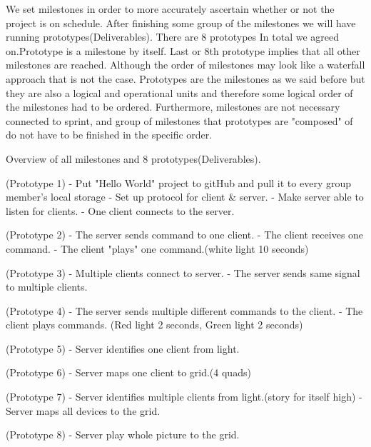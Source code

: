 \documentclass{article}
\begin{document}
We set milestones in order to more accurately ascertain whether or not the project is on schedule. After finishing some group of the milestones we will have running prototypes(Deliverables). There are 8 prototypes In total we 
agreed on.Prototype is a milestone by itself. Last or 8th prototype implies that all other milestones are reached. Although the order of milestones may look like a waterfall approach that is not the case.
Prototypes are the milestones as we said before but they are also a logical and operational units and therefore some logical order of the milestones had to be ordered. Furthermore, milestones are not 
necessary connected to sprint, and group of milestones that prototypes are "composed" of do not have to be finished in the specific order.


Overview of all milestones and 8 prototypes(Deliverables).


(Prototype 1)
- Put "Hello World" project to gitHub and pull it to every group member's local storage 
- Set up protocol for client \& server.
- Make server able to listen for clients.
- One client connects to the server.


(Prototype 2)
- The server sends command to one client.
- The client receives one command.
- The client "plays" one command.(white light 10 seconds)


(Prototype 3)
- Multiple clients connect to server.
- The server sends same signal to multiple clients.


(Prototype 4)
- The server sends multiple different commands to the client.
- The client plays commands. (Red light 2 seconds, Green light 2 seconds)


(Prototype 5)
- Server identifies one client from light.


(Prototype 6)
- Server maps one client to grid.(4 quads)


(Prototype 7)
- Server identifies multiple clients from light.(story for itself high)
- Server maps all devices to the grid.


(Prototype 8)
- Server play whole picture to the grid.
\end{document}
